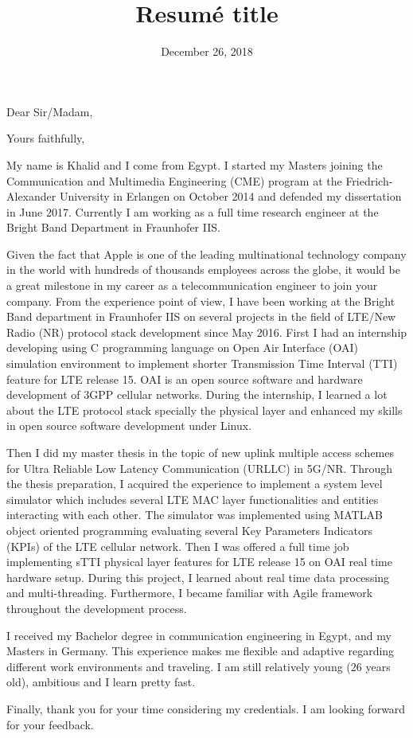 \documentclass[11pt,a4paper,sans]{moderncv}        %
\title{Resumé title}                               %
\begin{document}
\date{December 26, 2018}
\opening{Dear Sir/Madam,}
\closing{Yours faithfully,}
\makelettertitle

My name is Khalid and I come from Egypt. I started my Masters joining the Communication and Multimedia Engineering (CME) program at the Friedrich-Alexander University in Erlangen on October 2014 and defended my dissertation in June 2017. Currently I am working as a full time research engineer at the Bright Band Department in Fraunhofer IIS.

Given the fact that Apple is one of the leading multinational technology company in the world with hundreds of thousands employees across the globe, it would be a great milestone in my career as a telecommunication engineer to join your company. From the experience point of view, I have been working at the Bright Band department in Fraunhofer IIS on several projects in the field of LTE/New Radio (NR) protocol stack development since May 2016. First I had an internship developing using C programming language on Open Air Interface (OAI) simulation environment to implement shorter Transmission Time Interval (TTI) feature for LTE release 15. OAI is an open source software and hardware development of 3GPP cellular networks. During the internship, I learned a lot about the LTE protocol stack specially the physical layer and enhanced my skills in open source software development under Linux. 

Then I did my master thesis in the topic of new uplink multiple access schemes for Ultra Reliable Low Latency Communication (URLLC) in 5G/NR. Through the thesis preparation, I acquired the experience to implement a system level simulator which includes several LTE MAC layer functionalities and entities interacting with each other. The simulator was implemented using MATLAB object oriented programming evaluating several Key Parameters Indicators (KPIs) of the LTE cellular network. Then I was offered a full time job implementing sTTI physical layer features for LTE release 15 on OAI real time hardware setup. During this project, I learned about real time data processing and multi-threading. Furthermore, I became familiar with Agile framework throughout the development process. 

I received my Bachelor degree in communication engineering in Egypt, and my Masters in Germany. This experience makes me flexible and adaptive regarding different work environments and traveling. I am still relatively young (26 years old), ambitious and I learn pretty fast. 

Finally, thank you for your time considering my credentials. 
I am looking forward for your feedback.

\makeletterclosing
\end{document}
